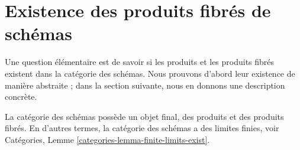 \section{Existence des produits fibrés de schémas}
\label{section-existence-fibre-products}

\noindent
Une question élémentaire est de savoir si les produits et les produits fibrés
existent dans la catégorie des schémas. Nous prouvons d'abord leur existence de
manière abstraite ; dans la section suivante, nous en donnons une description
concrète.

\begin{lemma}
\label{lemma-fibre-products}
La catégorie des schémas possède un objet final, des produits et des produits
fibrés. En d'autres termes, la catégorie des schémas a des limites finies, voir
Catégories, Lemme  \ref{categories-lemma-finite-limits-exist}.
\end{lemma}

